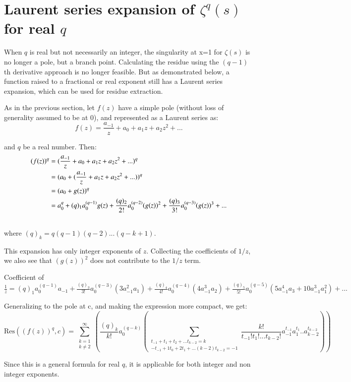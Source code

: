 \documentclass[a4paper,11pt,twoside]{amsart}
\newcommand\Res{\mathrm{Res}}
\begin{document}
\section{Laurent series expansion of $\zeta^q(s)$ for real $q$}
When $q$ is real but not necessarily an integer, the singularity at x=1 for $\zeta(s)$ is no longer a pole, but a branch point. Calculating the residue using the $(q-1)$th derivative approach is no longer feasible. But as demonstrated below, a function raised to a fractional or real exponent still has a Laurent series expansion, which can be used for residue extraction.

As in the previous section, let $f(z)$ have a simple pole (without loss of generality assumed to be at 0), and represented as a Laurent series as:
$$f(z) = \frac{a_{-1}}{z} + a_0 + a_1 z + a_2 z^2 + ...$$

and $q$ be a real number. Then:
\begin{align}
(f(z))^q &= (\frac{a_{-1}}{z} + a_0 + a_1 z + a_2 z^2 + ...)^q \notag\\
&= (a_0 + (\frac{a_{-1}}{z} + a_1 z + a_2 z^2 + ...))^q\notag\\
&= (a_0 + g(z))^q\notag\\
&= a_{0}^q + (q)_{1} a_{0}^{(q-1)} g(z) + \frac{(q)_{2}}{2!} a_{0}^{(q-2)} (g(z))^2 + \frac{(q)_{3}}{3!} a_{0}^{(q-3)} (g(z))^3 + ...\notag\\
\notag
\end{align}
where $(q)_k = q(q-1)(q-2)...(q-k+1)$.

This expansion has only integer exponents of $z$. Collecting the coefficients of $1/z$, we also see that $(g(z))^2$ does not contribute to the $1/z$ term.

Coefficient of $\frac{1}{z} = (q)_{1} a_{0}^{(q-1)} a_{-1} + \frac{(q)_{3}}{3!} a_{0}^{(q-3)} (3 a_{-1}^2 a_1) + \frac{(q)_{4}}{4!} a_{0}^{(q-4)} (4 a_{-1}^3 a_2) + \frac{(q)_{5}}{5!} a_{0}^{(q-5)} (5 a_{-1}^4 a_3 + 10 a_{-1}^3 a_{1}^2) + ...$

Generalizing to the pole at c, and making the expression more compact, we get: 
$$\Res((f(z))^q,c) = \sum\limits_{\substack{k=1 \\ k \ne 2}}^{\infty} (\frac{(q)_{k}}{k!} a_{0}^{(q-k)} (\sum\limits_{\substack{t_{-1} + t_1 + t_2 + ... t_{k-2} = k \\ -t_{-1} + 1t_0 + 2t_1 + ... (k-2)t_{k-2} = -1}} \frac{k!}{t_{-1}!t_{1}!...t_{k-2}!} a_{-1}^{t_{-1}} a_{1}^{t_1}..a_{k-2}^{t_{k-2}}))$$

Since this is a general formula for real $q$, it is applicable for both integer and non integer exponents.
\end{document}
